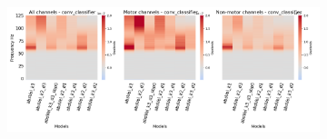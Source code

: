 \begin{figure}[!htpb]
\begin{subfigure}[b]{\textwidth}
   \includegraphics[width=1\linewidth]{img/appendix/D/conv-classifier/hp-m/absVel_model_gradients_all_kinds}
   \caption{}
   \label{fig:absVel-pw-hp-grads-conv-classifier}
\end{subfigure}

\caption[]{}
\label{fig:absVel-pw-hp-grads}
\end{figure}